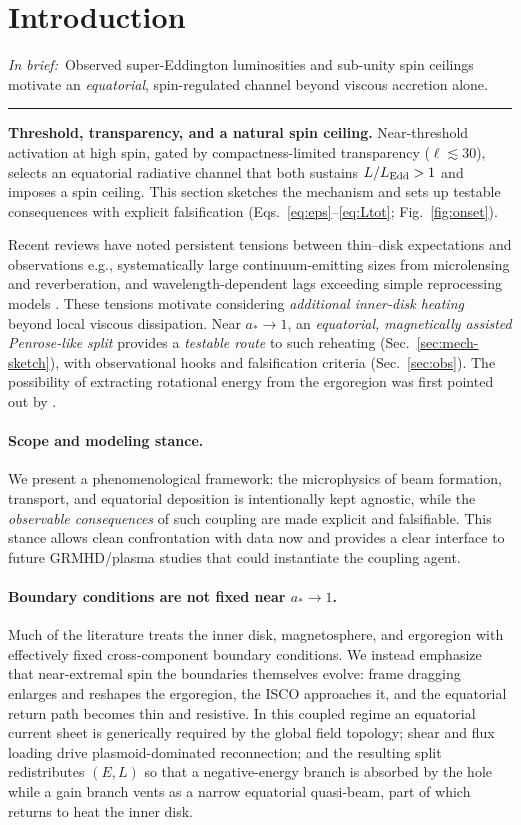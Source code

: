 \documentclass[twocolumn]{aastex701}
\newcommand{\ellcrit}{30}
\newcommand{\ellsoft}{\ell\lesssim\ellcrit}  %
\DeclareRobustCommand{\tldr}[1]{%
  \noindent\textit{In brief:}~#1%
  \par\smallskip
  \noindent\rule{\columnwidth}{0.2pt}\par\medskip
}
\begin{document}
\section{Introduction}\label{sec:intro}
\tldr{Observed super-Eddington luminosities and sub-unity spin ceilings motivate an \emph{equatorial}, spin-regulated channel beyond viscous accretion alone.}
\noindent\textbf{Threshold, transparency, and a natural spin ceiling.}
Near-threshold activation at high spin, gated by compactness-limited transparency ($\ellsoft$), selects an equatorial radiative channel that both sustains $L/L_{\rm Edd}>1$ and imposes a spin ceiling.
This section sketches the mechanism and sets up testable consequences with explicit falsification (Eqs.~\eqref{eq:eps}--\eqref{eq:Ltot}; Fig.~\ref{fig:onset}).

Recent reviews have noted persistent tensions between thin--disk expectations and observations\textemdash{}
e.g., systematically large continuum-emitting sizes from microlensing and reverberation, and
wavelength-dependent lags exceeding simple reprocessing models \citep[e.g.,][]{Cackett2021RevMap,Sun2020AGNsize}.
These tensions motivate considering \emph{additional inner-disk heating} beyond local viscous dissipation.
Near $a_*\!\to\!1$, an \emph{equatorial, magnetically assisted Penrose-like split} provides a \emph{testable route}
to such reheating (Sec.~\ref{sec:mech-sketch}), with observational hooks and falsification criteria
(Sec.~\ref{sec:obs}).
The possibility of extracting rotational energy from the ergoregion was first pointed out by \citep{Penrose1969,Penrose2002}.


\paragraph{Scope and modeling stance.}
We present a phenomenological framework: the microphysics of beam formation, transport, and equatorial deposition is intentionally kept agnostic, while the \emph{observable consequences} of such coupling are made explicit and falsifiable. This stance allows clean confrontation with data now and provides a clear interface to future GRMHD/plasma studies that could instantiate the coupling agent.

\paragraph{Boundary conditions are not fixed near $a_*\!\to\!1$.}
Much of the literature treats the inner disk, magnetosphere, and ergoregion with effectively fixed cross-component boundary conditions. We instead emphasize that near-extremal spin the boundaries themselves evolve: frame dragging enlarges and reshapes the ergoregion, the ISCO approaches it, and the equatorial return path becomes thin and resistive. In this coupled regime an equatorial current sheet is generically required by the global field topology; shear and flux loading drive plasmoid-dominated reconnection; and the resulting split redistributes $(E,L)$ so that a negative-energy branch is absorbed by the hole while a gain branch vents as a narrow equatorial quasi-beam, part of which returns to heat the inner disk.
\end{document}
